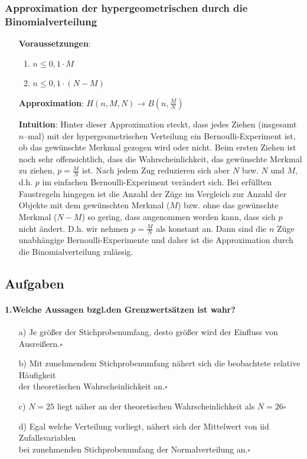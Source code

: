 \documentclass[a4paper]{article}
\begin{document}
\subsubsection{Approximation der hypergeometrischen durch die Binomialverteilung}\label{sec:HypBin}
\begin{itemize}
\item[] \textbf{Voraussetzungen}: \begin{enumerate}
\item $n \leq 0,1\cdot M$
\item $n \leq 0,1\cdot (N-M)$
\end{enumerate}
\item[] \textbf{Approximation}: $H(n,M,N) \rightarrow B(n, \frac{M}{N})$
\item[] \textbf{Intuition}: Hinter dieser Approximation steckt, dass jedes Ziehen (insgesamt $n$--mal) mit der hypergeometrischen Verteilung ein Bernoulli-Experiment ist, ob das gewünschte Merkmal gezogen wird oder nicht. Beim ersten Ziehen ist noch sehr offensichtlich, dass die Wahrscheinlichkeit, das gewünschte Merkmal zu ziehen, $p=\frac{M}{N}$ ist. Nach jedem Zug reduzieren sich aber $N$ bzw. $N$ und $M$, d.h. $p$ im einfachen Bernoulli-Experiment verändert sich. Bei erfüllten Faustregeln hingegen ist die Anzahl der Züge im Vergleich zur Anzahl der Objekte mit dem gewünschten Merkmal ($M$) bzw. ohne das gewünschte Merkmal ($N-M$) so gering, dass angenommen werden kann, dass sich $p$ nicht ändert. D.h. wir nehmen $p=\frac{M}{N}$ als konstant an. Dann sind die $n$ Züge unabhängige Bernoulli-Experimente und daher ist die Approximation durch die Binomialverteilung zulässig.
\end{itemize}

\clearpage
\subsection{Aufgaben}
\paragraph{1.Welche Aussagen bzgl.den Grenzwertsätzen ist wahr?}
\begin{itemize}
    \item[a)]Je größer der Stichprobenumfang, desto größer wird der Einfluss von Ausreißern.\hfill $\square$
    \item[b)]Mit zunehmendem Stichprobenumfang nähert sich die beobachtete relative Häufigkeit\\ der theoretischen Wahrscheinlichkeit an.\hfill $\square$
    \item[c)]$N=25$ liegt näher an der theoretischen Wahrscheinlichkeit als $N=26$\hfill $\square$
    \item[d)]Egal welche Verteilung vorliegt, nähert sich der Mittelwert von iid Zufallsvariablen\\ bei zunehmenden Stichprobenumfang der Normalverteilung an.\hfill $\square$
\end{itemize}
\end{document}
